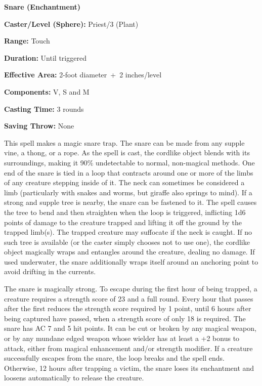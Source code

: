 \begin{multicols}{2}
\begin{minipage}{\columnwidth}
\noindent \textbf{Snare (Enchantment)}

\noindent \textbf{Caster/Level (Sphere):} Priest/3 (Plant)

\noindent \textbf{Range:} Touch

\noindent \textbf{Duration:} Until triggered

\noindent \textbf{Effective Area:} 2-foot diameter~+~2 inches/level

\noindent \textbf{Components:} V, S and M

\noindent \textbf{Casting Time:} 3 rounds

\noindent \textbf{Saving Throw:} None

\end{minipage}

This spell makes a magic snare trap. The snare can be made from any supple vine, a thong, or a rope.  As the spell is cast, the cordlike object blends with its surroundings, making it 90\% undetectable to normal, non-magical methods. One end of the snare is tied in a loop that contracts around one or more of the limbs of any creature stepping inside of it.  The neck can sometimes be considered a limb (particularly with snakes and worms, but giraffe also springs to mind).  If a strong and supple tree is nearby, the snare can be fastened to it.  The spell causes the tree to bend and then straighten when the loop is triggered, inflicting 1d6 points of damage to the creature trapped and lifting it off the ground by the trapped limb(s).  The trapped creature may suffocate if the neck is caught.  If no such tree is available (or the caster simply chooses not to use one), the cordlike object magically wraps and entangles around the creature, dealing no damage.  If used underwater, the snare additionally wraps itself around an anchoring point to avoid drifting in the currents.  

The snare is magically strong.  To escape during the first hour of being trapped, a creature requires a strength score of 23 and a full round.  Every hour that passes after the first reduces the strength score required by 1 point, until 6 hours after being captured have passed, when a strength score of only 18 is required.  The snare has AC 7 and 5 hit points.  It can be cut or broken by any magical weapon, or by any mundane edged weapon whose wielder has at least a +2 bonus to attack, either from magical enhancement and/or strength modifier.  If a creature successfully escapes from the snare, the loop breaks and the spell ends.  Otherwise, 12 hours after trapping a victim, the snare loses its enchantment and loosens automatically to release the creature.


\end{multicols}
